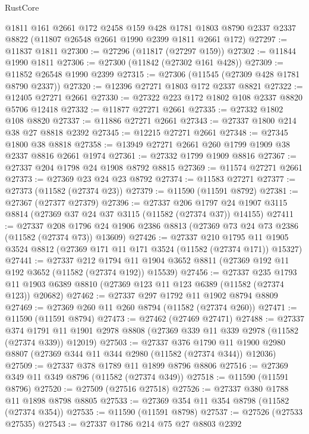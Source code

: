 \begin{lexlean}{RustCore}
\begin{coremodule}
    @1811
    @161
    @2661
    @172
    @2458
    @159
    @428
    @1781
    @1803
    @8790
    @2337
    @2337
    @8822
    (@11807 @26548 @2661 @1990 @2399 @1811 @2661 @172)
@27297 := @11837 @1811
@27300 := @27296 (@11817 (@27297 @159))
@27302 := @11844 @1990 @1811
@27306 := @27300 (@11842 (@27302 @161 @428))
@27309 := @11852 @26548 @1990 @2399
@27315 := @27306 (@11545 (@27309 @428 @1781 @8790 @2337))
@27320 := @12396 @27271 @1803 @172 @2337 @8821
@27322 := @12405 @27271 @2661
@27330 := @27322 @223 @172 @1802 @108 @2337 @8820 @5706 @12418
@27332 := @11877 @27271 @2661
@27335 := @27332 @1802 @108 @8820
@27337 := @11886 @27271 @2661
@27343 := @27337 @1800 @214 @38 @27 @8818 @2392
@27345 := @12215 @27271 @2661
@27348 := @27345 @1800 @38 @8818
@27358 := @13949 @27271 @2661 @260 @1799 @1909 @38 @2337 @8816 @2661 @1974
@27361 := @27332 @1799 @1909 @8816
@27367 := @27337 @204 @1798 @24 @1908 @8792 @8815
@27369 := @11574 @27271 @2661
@27373 := @27369 @23 @24 @23 @8792
@27374 := @11583 @27271
@27377 := @27373 (@11582 (@27374 @23))
@27379 := @11590 (@11591 @8792)
@27381 := @27367 (@27377 @27379)
@27396 := @27337
    @206
    @1797
    @24
    @1907
    @3115
    @8814
    (@27369 @37 @24 @37 @3115 (@11582 (@27374 @37)) @14155)
@27411 := @27337
    @208
    @1796
    @24
    @1906
    @2386
    @8813
    (@27369 @73 @24 @73 @2386 (@11582 (@27374 @73)) @13609)
@27426 := @27337
    @210
    @1795
    @11
    @1905
    @3524
    @8812
    (@27369 @171 @11 @171 @3524 (@11582 (@27374 @171)) @15327)
@27441 := @27337
    @212
    @1794
    @11
    @1904
    @3652
    @8811
    (@27369 @192 @11 @192 @3652 (@11582 (@27374 @192)) @15539)
@27456 := @27337
    @235
    @1793
    @11
    @1903
    @6389
    @8810
    (@27369 @123 @11 @123 @6389 (@11582 (@27374 @123)) @20682)
@27462 := @27337 @297 @1792 @11 @1902 @8794 @8809
@27469 := @27369 @260 @11 @260 @8794 (@11582 (@27374 @260))
@27471 := @11590 (@11591 @8794)
@27473 := @27462 (@27469 @27471)
@27488 := @27337
    @374
    @1791
    @11
    @1901
    @2978
    @8808
    (@27369 @339 @11 @339 @2978 (@11582 (@27374 @339)) @12019)
@27503 := @27337
    @376
    @1790
    @11
    @1900
    @2980
    @8807
    (@27369 @344 @11 @344 @2980 (@11582 (@27374 @344)) @12036)
@27509 := @27337 @378 @1789 @11 @1899 @8796 @8806
@27516 := @27369 @349 @11 @349 @8796 (@11582 (@27374 @349))
@27518 := @11590 (@11591 @8796)
@27520 := @27509 (@27516 @27518)
@27526 := @27337 @380 @1788 @11 @1898 @8798 @8805
@27533 := @27369 @354 @11 @354 @8798 (@11582 (@27374 @354))
@27535 := @11590 (@11591 @8798)
@27537 := @27526 (@27533 @27535)
@27543 := @27337 @1786 @214 @75 @27 @8803 @2392

\end{coremodule}
\end{lexlean}
